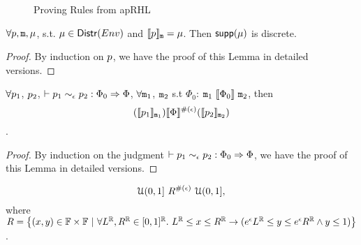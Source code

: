 \documentclass[a4paper,11pt]{article}
\begin{document}
%
\begin{figure}[ht]
\caption{Proving Rules from apRHL}
\label{fig:aprhl}
\end{figure}
%
%
\begin{lem}
 $\forall p, \mathtt{m}, \mu$,  s.t. $\mu \in \mathsf{Distr}(Env)$ and $\llbracket p \rrbracket_{\mathtt{m}} = \mu$. Then $\mathsf{supp}{(\mu)}$ is discrete.
\end{lem}
%
\begin{proof}
By induction on $p$, we have the proof of this Lemma in detailed versions.
\end{proof}
%
%
\begin{thm}[Soundness]
 $\forall p_1$, $p_2$,  $ \vdash p_1	
\sim_{\epsilon} 
p_2 :
\Phi_0 \Rightarrow \Phi $,    $\forall \mathtt{m}_1$, $\mathtt{m}_2$ 
s.t $\Phi_0$: 
$\mathtt{m}_1 ~ \llbracket \Phi_0 \rrbracket ~ \mathtt{m}_2$,
then
$$ 
(\llbracket p_1 \rrbracket_{\mathtt{m}_1})  
\llbracket \Phi \rrbracket^{\#(\epsilon)} 
(\llbracket p_2 \rrbracket_{\mathtt{m}_2}) 
$$.
\end{thm}
%
%
%
\begin{proof}
By induction on the judgment $\vdash p_1	
\sim_{\epsilon}
p_2 :
\Phi_0 \Rightarrow \Phi $,  we have the proof of this Lemma in detailed versions.
\end{proof}
%
%
\begin{thm}
\label{thm:unif+_coupling}
%
$${\mathcal{U}(0,1]} ~ R^{\#(\epsilon)} ~ {\mathcal{U}(0,1]},$$
%
where
	$	R = 
		\left \{(x, y) \in {\mathbb{F}} \times {\mathbb{F}} 
		~|~
		\forall L^{\mathbb{R}}, R^{\mathbb{R}} \in [0,1]^{\mathbb{R}}. ~
		L^{\mathbb{R}} \leq x \leq R^{\mathbb{R}}
		\rightarrow
		(e^{\epsilon} L^{\mathbb{R}} \leq y \leq 	e^{\epsilon} R^{\mathbb{R}}
		\land y \leq 1)
		\right \}
		$.
\end{thm}
\end{document}
